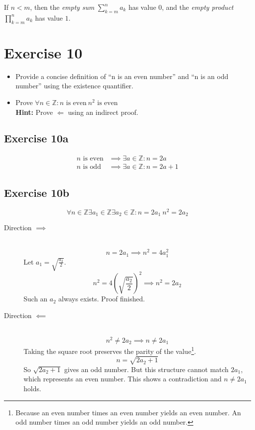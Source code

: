 \documentclass[a4paper]{article}
\theoremstyle{definition}
\begin{document}
If $n < m$, then the \emph{empty sum} $\sum_{k=m}^n a_k$ has value $0$,
and the \emph{empty product} $\prod_{k=m}^n a_k$ has value $1$.

\section{Exercise 10}
\begin{ex} \hfill{}
  \begin{itemize}
    \item Provide a concise definition of \enquote{n is an even number}
          and \enquote{n is an odd number} using the existence quantifier.
    \item Prove $\forall n \in \mathbb Z: n \text{ is even} \ n^2 \text{ is even}$ \\
          \textbf{Hint:} Prove $\Leftarrow$ using an indirect proof.
  \end{itemize}
\end{ex}

\subsection{Exercise 10a}
\begin{align*}
  n \text{ is even} &\implies \exists a \in \mathbb Z: n = 2a \\
  n \text{ is odd} &\implies \exists a \in \mathbb Z: n = 2a + 1
\end{align*}

\subsection{Exercise 10b}
\[
    \forall n \in \mathbb Z \exists a_1 \in \mathbb Z \exists a_2 \in \mathbb Z:
    n = 2a_1 \ n^2 = 2a_2
\]

\begin{description}
  \item[Direction $\implies$] \hfill{} \\
    \[ n = 2a_1 \implies n^2 = 4a_1^2 \]
    Let $a_1 = \sqrt{\frac{a_2}{2}}$.
    \[ n^2 = 4\left(\sqrt{\frac{a_2}{2}}\right)^2 \implies n^2 = 2a_2 \]
    Such an $a_2$ always exists. Proof finished.
  \item[Direction $\impliedby$] \hfill{} \\
    \[ n^2 \neq 2a_2 \implies n \neq 2a_1 \]
    Taking the square root preserves the parity of the value\footnote{
    Because an even number times an even number yields an even number.
    An odd number times an odd number yields an odd number.}.
    \[ n = \sqrt{2a_2 + 1} \]
    So $\sqrt{2a_2 + 1}$ gives an odd number.
    But this structure cannot match $2a_1$, which represents an even number.
    This shows a contradiction and $n \neq 2a_1$ holds.
\end{description}
\end{document}

